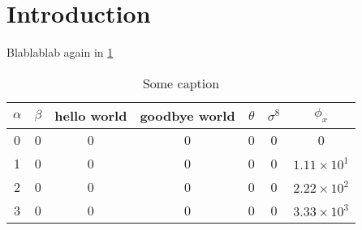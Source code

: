 \section{Introduction}
\label{sample_chapter:introduction}

Blablablab again in \ref{table:some_table}

\begin{table}[!htb]
	\centering
	\caption{Some caption}
	\label{table:some_table}
	    \begin{tabular}{ c c c c c c c}
	    $\alpha$ & $\beta$ & hello world & goodbye world & $\theta$ & $\sigma^{8}$ & $\phi_{x}$
	    \\
	    \hline
	    0 & 0 & 0 & 0 & 0 & 0 & 0                    \\
	    1 & 0 & 0 & 0 & 0 & 0 & $1.11 \times 10^{1}$ \\
	    2 & 0 & 0 & 0 & 0 & 0 & $2.22 \times 10^{2}$ \\
	    3 & 0 & 0 & 0 & 0 & 0 & $3.33 \times 10^{3}$ \\
	    \end{tabular}	    
\end{table}	